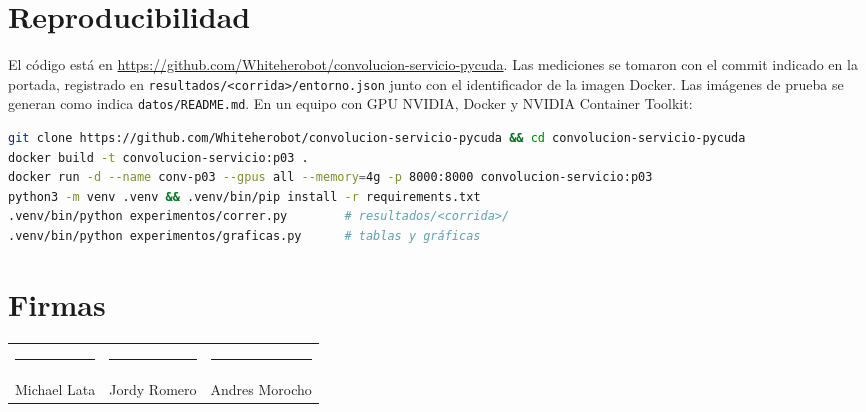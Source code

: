 \documentclass[12pt]{article}
\newcommand{\repo}{\url{https://github.com/Whiteherobot/convolucion-servicio-pycuda}}
\begin{document}
\section{Reproducibilidad}

El código está en \repo. Las mediciones se tomaron con el commit indicado en la portada, registrado
en \texttt{resultados/<corrida>/entorno.json} junto con el identificador de la imagen Docker. Las
imágenes de prueba se generan como indica \texttt{datos/README.md}. En un equipo con GPU NVIDIA,
Docker y NVIDIA Container Toolkit:

\begin{lstlisting}[language=bash]
git clone https://github.com/Whiteherobot/convolucion-servicio-pycuda && cd convolucion-servicio-pycuda
docker build -t convolucion-servicio:p03 .
docker run -d --name conv-p03 --gpus all --memory=4g -p 8000:8000 convolucion-servicio:p03
python3 -m venv .venv && .venv/bin/pip install -r requirements.txt
.venv/bin/python experimentos/correr.py        # resultados/<corrida>/
.venv/bin/python experimentos/graficas.py      # tablas y gráficas
\end{lstlisting}

\section*{Firmas}
\vspace{1.5cm}
\noindent
\begin{tabular}{ccc}
\rule{4.3cm}{0.4pt} & \rule{4.3cm}{0.4pt} & \rule{4.3cm}{0.4pt} \\
Michael Lata & Jordy Romero & Andres Morocho \\
\end{tabular}




\end{document}
